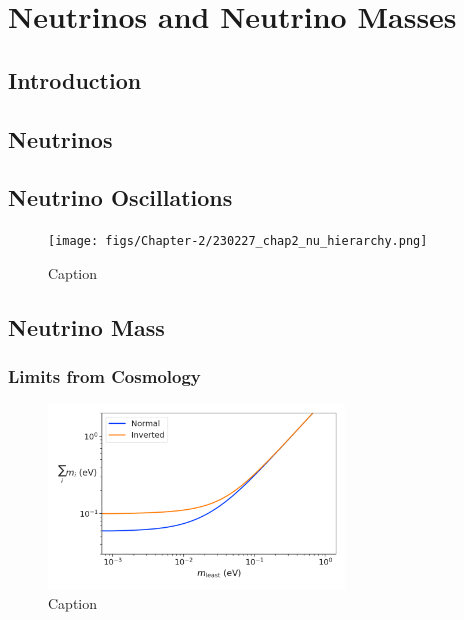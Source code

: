 
\chapter{Neutrinos and Neutrino Masses}

\section{Introduction}

\section{Neutrinos}

\section{Neutrino Oscillations}

\begin{figure}[htbp]
    \centering
    \texttt{[image: figs/Chapter-2/230227\_chap2\_nu\_hierarchy.png]}
    \caption{Caption}
    \label{fig:nu_hierarchy}
\end{figure}

\section{Neutrino Mass}

\subsection{Limits from Cosmology}

\begin{figure}[htbp]
    \centering
    \includegraphics[width=0.7\textwidth]{figs/Chapter-2/230301_cosmology_nu_mass_observable.png}
    \caption{Caption}
    \label{fig:nu_mass_cosmo}
\end{figure}


